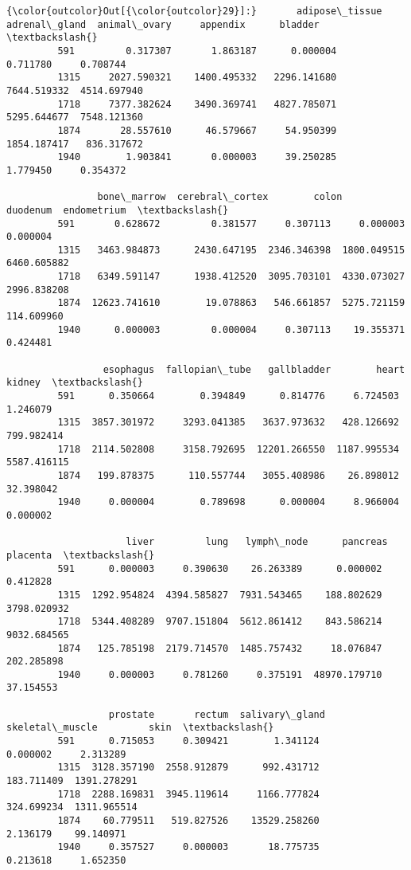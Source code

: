 \documentclass[11pt]{article}
\begin{document}
\begin{Verbatim}[commandchars=\\\{\}]
{\color{outcolor}Out[{\color{outcolor}29}]:}       adipose\_tissue  adrenal\_gland  animal\_ovary     appendix      bladder  \textbackslash{}
         591         0.317307       1.863187      0.000004     0.711780     0.708744   
         1315     2027.590321    1400.495332   2296.141680  7644.519332  4514.697940   
         1718     7377.382624    3490.369741   4827.785071  5295.644677  7548.121360   
         1874       28.557610      46.579667     54.950399  1854.187417   836.317672   
         1940        1.903841       0.000003     39.250285     1.779450     0.354372   
         
                bone\_marrow  cerebral\_cortex        colon     duodenum  endometrium  \textbackslash{}
         591       0.628672         0.381577     0.307113     0.000003     0.000004   
         1315   3463.984873      2430.647195  2346.346398  1800.049515  6460.605882   
         1718   6349.591147      1938.412520  3095.703101  4330.073027  2996.838208   
         1874  12623.741610        19.078863   546.661857  5275.721159   114.609960   
         1940      0.000003         0.000004     0.307113    19.355371     0.424481   
         
                 esophagus  fallopian\_tube   gallbladder        heart       kidney  \textbackslash{}
         591      0.350664        0.394849      0.814776     6.724503     1.246079   
         1315  3857.301972     3293.041385   3637.973632   428.126692   799.982414   
         1718  2114.502808     3158.792695  12201.266550  1187.995534  5587.416115   
         1874   199.878375      110.557744   3055.408986    26.898012    32.398042   
         1940     0.000004        0.789698      0.000004     8.966004     0.000002   
         
                     liver         lung   lymph\_node      pancreas     placenta  \textbackslash{}
         591      0.000003     0.390630    26.263389      0.000002     0.412828   
         1315  1292.954824  4394.585827  7931.543465    188.802629  3798.020932   
         1718  5344.408289  9707.151804  5612.861412    843.586214  9032.684565   
         1874   125.785198  2179.714570  1485.757432     18.076847   202.285898   
         1940     0.000003     0.781260     0.375191  48970.179710    37.154553   
         
                  prostate       rectum  salivary\_gland  skeletal\_muscle         skin  \textbackslash{}
         591      0.715053     0.309421        1.341124         0.000002     2.313289   
         1315  3128.357190  2558.912879      992.431712       183.711409  1391.278291   
         1718  2288.169831  3945.119614     1166.777824       324.699234  1311.965514   
         1874    60.779511   519.827526    13529.258260         2.136179    99.140971   
         1940     0.357527     0.000003       18.775735         0.213618     1.652350   
         

\end{Verbatim}
\end{document}
